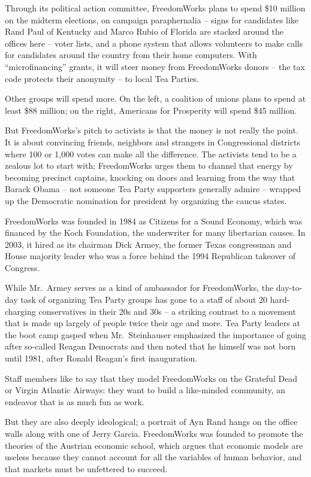 ﻿\documentclass[12pt]{article}
\begin{document}
Through its political action committee, FreedomWorks plans to spend \$10 million on the midterm
elections, on campaign paraphernalia -- signs for candidates like Rand Paul of Kentucky and Marco
Rubio of Florida are stacked around the offices here -- voter lists, and a phone system that allows
volunteers to make calls for candidates around the country from their home computers. With
``microfinancing'' grants, it will steer money from FreedomWorks donors -- the tax code protects
their anonymity -- to local Tea Parties.

Other groups will spend more. On the left, a coalition of unions plans to spend at least \$88
million; on the right, Americans for Prosperity will spend \$45 million.

But FreedomWorks's pitch to activists is that the money is not really the point. It is about
convincing friends, neighbors and strangers in Congressional districts where 100 or 1,000 votes can
make all the difference. The activists tend to be a zealous lot to start with; FreedomWorks urges
them to channel that energy by becoming precinct captains, knocking on doors and learning from the
way that Barack Obama -- not someone Tea Party supporters generally admire -- wrapped up the
Democratic nomination for president by organizing the caucus states.

FreedomWorks was founded in 1984 as Citizens for a Sound Economy, which was financed by the Koch
Foundation, the underwriter for many libertarian causes. In 2003, it hired as its chairman Dick
Armey, the former Texas congressman and House majority leader who was a force behind the 1994
Republican takeover of Congress.

While Mr.~Armey serves as a kind of ambassador for FreedomWorks, the day-to-day task of organizing
Tea Party groups has gone to a staff of about 20 hard-charging conservatives in their 20s and 30s --
a striking contrast to a movement that is made up largely of people twice their age and more. Tea
Party leaders at the boot camp gasped when Mr.~Steinhauser emphasized the importance of going after
so-called Reagan Democrats and then noted that he himself was not born until 1981, after Ronald
Reagan's first inauguration.

Staff members like to say that they model FreedomWorks on the Grateful Dead or Virgin Atlantic
Airways: they want to build a like-minded community, an endeavor that is as much fun as work.

But they are also deeply ideological; a portrait of Ayn Rand hangs on the office walls along with
one of Jerry Garcia. FreedomWorks was founded to promote the theories of the Austrian economic
school, which argues that economic models are useless because they cannot account for all the
variables of human behavior, and that markets must be unfettered to succeed.
\end{document}
